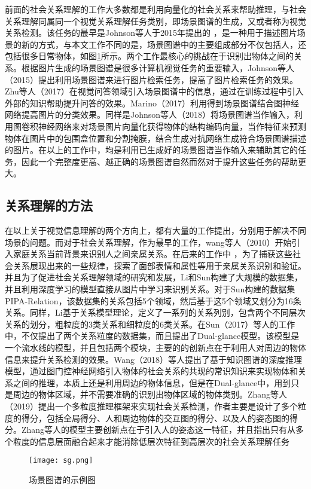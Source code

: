 前面的社会关系理解的工作大多数都是利用向量化的社会关系来帮助推理，与社会关系理解同属同一个视觉关系理解任务类别，即场景图谱的生成，又或者称为视觉关系检测。该任务的最早是Johnson等人于2015年提出的
\cite{johnson2015image}，是一种用于描述图片场景的新的方式，与本文工作不同的是，场景图谱中的主要组成部分不仅包括人，还包括很多日常物体，如图\ref{fig:sg-example}所示。两个工作最核心的挑战在于识别出物体之间的关系。根据图片生成的场景图谱是很多计算机视觉任务的重要输入，Johnson等人（2015）\cite{johnson2015image}提出利用场景图谱来进行图片检索任务，提高了图片检索任务的效果。Zhu等人（2017）\cite{zhu2017knowledge}在视觉问答领域引入场景图谱中的信息，通过在训练过程中引入外部的知识帮助提升问答的效果。Marino（2017）\cite{marino2017the}利用得到场景图谱结合图神经网络提高图片的分类效果。同样是Johnson等人（2018）\cite{johnson2018image}将场景图谱当作输入，利用图卷积神经网络来对场景图片向量化获得物体的结构编码向量，当作特征来预测物体在图片中的包围盒位置和分割掩膜，结合生成对抗网络生成符合场景图谱描述的图片。在以上的工作中，均是利用已生成好的场景图谱当作输入来辅助其它的任务，因此一个完整度更高、越正确的场景图谱自然而然对于提升这些任务的帮助更大。

\subsection{关系理解的方法}
在以上关于视觉信息理解的两个方向上，都有大量的工作提出，分别用于解决不同场景的问题。而对于社会关系理解，作为最早的工作，wang等人（2010）开始引入家庭关系当前背景来识别人之间亲属关系。在后来的工作中
\cite{dibeklioglu2013like,xia2012understanding,chen2012discovering}，为了捕获这些社会关系展现出来的一些规律，探索了面部表情和属性等用于亲属关系识别和验证。并且为了促进社会关系理解领域的研究和发展，Li\cite{li2017dual-glance}和Sun\cite{sun2017a}构建了大规模的数据集，并且利用深度学习的模型直接从图片中学习来识别关系。对于Sun构建的数据集PIPA-Relation，该数据集的关系包括5个领域，然后基于这5个领域又划分为16条关系。同样，Li基于关系模型理论，定义了一系列的关系列别，包含两个不同层次关系的划分，粗粒度的3类关系和细粒度的6类关系。在Sun（2017）等人的工作中，不仅提出了两个关系粒度的数据集，而且提出了Dual-glance模型。该模型是一个流水线的模型，并且包括两个模块，主要的的创新点在于利用人对周边的物体信息来提升关系检测的效果。Wang（2018）等人提出了基于知识图谱的深度推理模型，通过图门控神经网络引入物体的社会关系的共现的常识知识来实现物体和关系之间的推理，本质上还是利用周边的物体信息，但是在Dual-glance中，用到只是周边的物体区域，并不需要准确的识别出物体区域的物体类别。Zhang等人（2019）提出一个多粒度推理框架来实现社会关系检测，作者主要是设计了多个粒度的得分，包括全局得分、人和周边物体的交互图的得分、以及人的姿态图的得分。Zhang等人的模型主要创新点在于引入人的姿态这一特征，并且指出只有从多个粒度的信息层面融合起来才能消除低层次特征到高层次的社会关系理解任务
\begin{figure}[htpb]
	\centering
	\texttt{[image: sg.png]}
    \caption{场景图谱\cite{xu2017scene}的示例图}
	\vspace*{-3.5mm}
	\label{fig:sg-example}
\end{figure}

